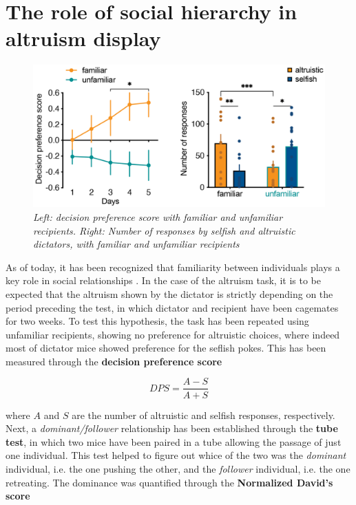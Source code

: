 \documentclass[12pt, a4paper]{report}
\begin{document}
\section{The role of social hierarchy in altruism display}

\begin{figure}[H]
	\begin{center}
		\includegraphics[scale=0.55]{familiar.png} 
	\end{center} 
	\caption{\textit{Left: decision preference score with familiar and unfamiliar recipients. Right: Number of responses by selfish and altruistic dictators, with familiar and unfamiliar recipients}} \label{familiar}
	
\end{figure}

As of today, it has been recognized that familiarity between individuals plays a key role in social relationships \cite{31}. %
 In the case of the altruism task, it is to be expected that the altruism shown by the dictator is strictly depending on the period preceding the test, in which dictator and recipient have been cagemates for two weeks. To test this hypothesis, the task has been repeated using unfamiliar recipients, showing no preference for altruistic choices, where indeed most of dictator mice showed preference for the seflish pokes. This has been measured through the \textbf{decision preference score} 

\begin{equation}
DPS = \frac{A -S}{A+S}
\end{equation}

where $A$ and $S$ are the number of altruistic and selfish responses, respectively.\\
Next, a \textit{dominant/follower} relationship has been established through the \textbf{tube test}, in which two mice have been paired in a tube allowing the passage of just one individual. This test helped to figure out whice of the two was the \textit{dominant} individual, i.e. the one pushing the other, and the \textit{follower} individual, i.e. the one retreating. The dominance was quantified through the \textbf{Normalized David's score} \cite{32} %
\end{document}

